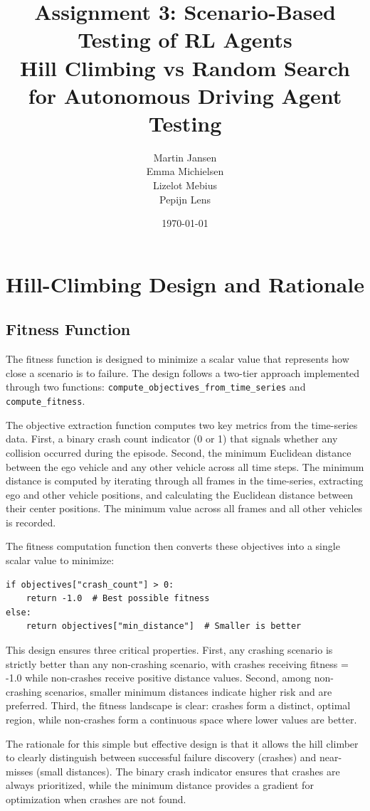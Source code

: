 \documentclass[11pt,a4paper]{article}
\title{Assignment 3: Scenario-Based Testing of RL Agents\\
\large Hill Climbing vs Random Search for Autonomous Driving Agent Testing}
\author{Martin Jansen \\ Emma Michielsen \\ Lizelot Mebius \\ Pepijn Lens}
\date{\today}
\begin{document}
\maketitle

\section{Hill-Climbing Design and Rationale}

\subsection{Fitness Function}

The fitness function is designed to minimize a scalar value that represents how close a scenario is to failure. The design follows a two-tier approach implemented through two functions: \texttt{compute\_objectives\_from\_time\_series} and \texttt{compute\_fitness}.

The objective extraction function computes two key metrics from the time-series data. First, a binary crash count indicator (0 or 1) that signals whether any collision occurred during the episode. Second, the minimum Euclidean distance between the ego vehicle and any other vehicle across all time steps. The minimum distance is computed by iterating through all frames in the time-series, extracting ego and other vehicle positions, and calculating the Euclidean distance between their center positions. The minimum value across all frames and all other vehicles is recorded.

The fitness computation function then converts these objectives into a single scalar value to minimize:

\begin{lstlisting}
if objectives["crash_count"] > 0:
    return -1.0  # Best possible fitness
else:
    return objectives["min_distance"]  # Smaller is better
\end{lstlisting}

This design ensures three critical properties. First, any crashing scenario is strictly better than any non-crashing scenario, with crashes receiving fitness = -1.0 while non-crashes receive positive distance values. Second, among non-crashing scenarios, smaller minimum distances indicate higher risk and are preferred. Third, the fitness landscape is clear: crashes form a distinct, optimal region, while non-crashes form a continuous space where lower values are better.

The rationale for this simple but effective design is that it allows the hill climber to clearly distinguish between successful failure discovery (crashes) and near-misses (small distances). The binary crash indicator ensures that crashes are always prioritized, while the minimum distance provides a gradient for optimization when crashes are not found.
\end{document}
